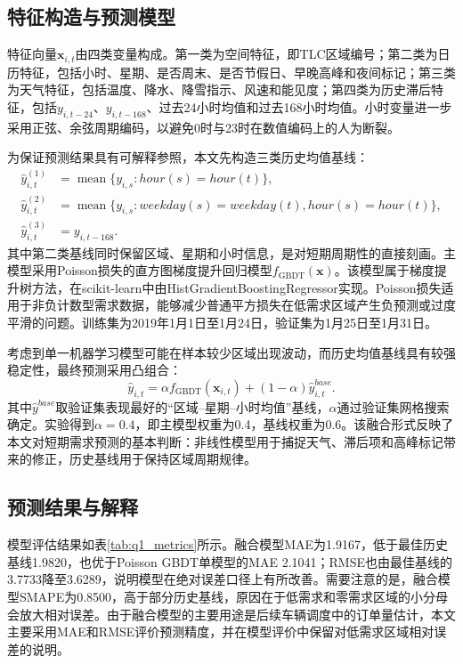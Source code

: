 \documentclass[UTF8,a4paper,12pt]{ctexart}
\begin{document}
\subsection{特征构造与预测模型}
特征向量$\bm{x}_{i,t}$由四类变量构成。第一类为空间特征，即TLC区域编号；第二类为日历特征，包括小时、星期、是否周末、是否节假日、早晚高峰和夜间标记；第三类为天气特征，包括温度、降水、降雪指示、风速和能见度；第四类为历史滞后特征，包括$y_{i,t-24}$、$y_{i,t-168}$、过去24小时均值和过去168小时均值。小时变量进一步采用正弦、余弦周期编码，以避免0时与23时在数值编码上的人为断裂。

为保证预测结果具有可解释参照，本文先构造三类历史均值基线：
\begin{align}
    \hat{y}^{(1)}_{i,t} &= \operatorname{mean}\{y_{i,s}: hour(s)=hour(t)\},\\
    \hat{y}^{(2)}_{i,t} &= \operatorname{mean}\{y_{i,s}: weekday(s)=weekday(t), hour(s)=hour(t)\},\\
    \hat{y}^{(3)}_{i,t} &= y_{i,t-168}.
\end{align}
其中第二类基线同时保留区域、星期和小时信息，是对短期周期性的直接刻画。主模型采用Poisson损失的直方图梯度提升回归模型$f_{\mathrm{GBDT}}(\bm{x})$。该模型属于梯度提升树方法，在scikit-learn中由HistGradientBoostingRegressor实现\cite{sklearn,pedregosa}。Poisson损失适用于非负计数型需求数据，能够减少普通平方损失在低需求区域产生负预测或过度平滑的问题。训练集为2019年1月1日至1月24日，验证集为1月25日至1月31日。

考虑到单一机器学习模型可能在样本较少区域出现波动，而历史均值基线具有较强稳定性，最终预测采用凸组合：
\begin{equation}
    \hat{y}_{i,t}=\alpha f_{\mathrm{GBDT}}(\bm{x}_{i,t})+(1-\alpha)\hat{y}^{base}_{i,t}.
\end{equation}
其中$\hat{y}^{base}$取验证集表现最好的“区域--星期--小时均值”基线，$\alpha$通过验证集网格搜索确定。实验得到$\alpha=0.4$，即主模型权重为0.4，基线权重为0.6。该融合形式反映了本文对短期需求预测的基本判断：非线性模型用于捕捉天气、滞后项和高峰标记带来的修正，历史基线用于保持区域周期规律。

\subsection{预测结果与解释}
模型评估结果如表\ref{tab:q1_metrics}所示。融合模型MAE为1.9167，低于最佳历史基线1.9820，也优于Poisson GBDT单模型的MAE 2.1041；RMSE也由最佳基线的3.7733降至3.6289，说明模型在绝对误差口径上有所改善。需要注意的是，融合模型SMAPE为0.8500，高于部分历史基线，原因在于低需求和零需求区域的小分母会放大相对误差。由于融合模型的主要用途是后续车辆调度中的订单量估计，本文主要采用MAE和RMSE评价预测精度，并在模型评价中保留对低需求区域相对误差的说明。
\end{document}
